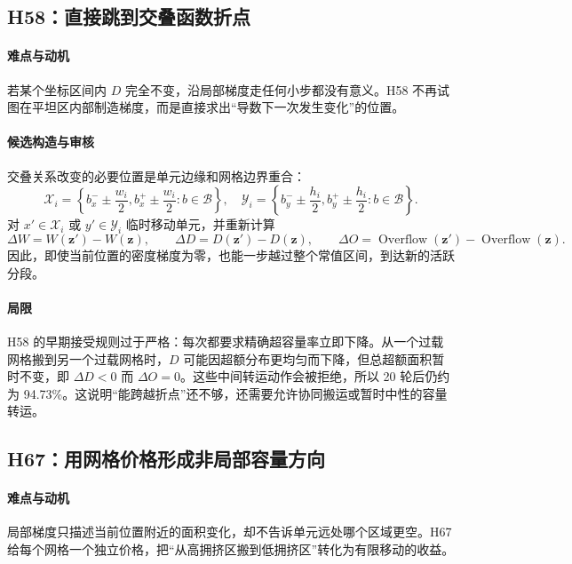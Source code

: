 \documentclass[UTF8,a4paper,11pt]{ctexrep}
\newcommand{\Overflow}{\operatorname{Overflow}}
\newcommand{\Bcal}{\mathcal{B}}
\begin{document}
\subsection{H58：直接跳到交叠函数折点}
\paragraph{难点与动机}
若某个坐标区间内 $D$ 完全不变，沿局部梯度走任何小步都没有意义。H58 不再试图在平坦区内部制造梯度，而是直接求出“导数下一次发生变化”的位置。

\paragraph{候选构造与审核}
交叠关系改变的必要位置是单元边缘和网格边界重合：
\begin{equation}
 \mathcal X_i=\left\{b_x^-\!\pm\frac{w_i}{2},
 b_x^+\!\pm\frac{w_i}{2}:b\in\Bcal\right\},
 \quad
 \mathcal Y_i=\left\{b_y^-\!\pm\frac{h_i}{2},
 b_y^+\!\pm\frac{h_i}{2}:b\in\Bcal\right\}. \label{eq:allbreakpoints}
\end{equation}
对 $x'\in\mathcal X_i$ 或 $y'\in\mathcal Y_i$ 临时移动单元，并重新计算
\begin{equation}
 \Delta W=W(\bm z')-W(\bm z),\qquad
 \Delta D=D(\bm z')-D(\bm z),\qquad
 \Delta O=\Overflow(\bm z')-\Overflow(\bm z). \label{eq:h58audit}
\end{equation}
因此，即使当前位置的密度梯度为零，也能一步越过整个常值区间，到达新的活跃分段。

\paragraph{局限}
H58 的早期接受规则过于严格：每次都要求精确超容量率立即下降。从一个过载网格搬到另一个过载网格时，$D$ 可能因超额分布更均匀而下降，但总超额面积暂时不变，即 $\Delta D<0$ 而 $\Delta O=0$。这些中间转运动作会被拒绝，所以 20 轮后仍约为 94.73\%。这说明“能跨越折点”还不够，还需要允许协同搬运或暂时中性的容量转运。

\subsection{H67：用网格价格形成非局部容量方向}
\paragraph{难点与动机}
局部梯度只描述当前位置附近的面积变化，却不告诉单元远处哪个区域更空。H67 给每个网格一个独立价格，把“从高拥挤区搬到低拥挤区”转化为有限移动的收益。
\end{document}
